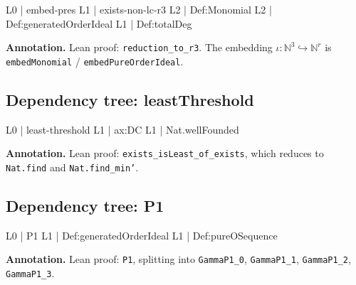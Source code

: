 \documentclass[11pt,reqno]{amsart}
\providecommand{\N}{\mathbb{N}}
\begin{document}
\noindent%
\begin{minipage}[t]{0.48\linewidth}
	\vspace{0pt}
	\begin{verbatimbox}
		L0 | embed-pres
		L1 |   exists-non-lc-r3
		L2 |     Def:Monomial
		L2 |     Def:generatedOrderIdeal
		L1 |   Def:totalDeg
	\end{verbatimbox}
\end{minipage}\hfill 
\begin{minipage}[t]{0.48\linewidth}
	\vspace{0pt}
	\textbf{Annotation.} Lean proof: \texttt{reduction\_to\_r3}. The embedding $\iota:\N^{3}\hookrightarrow\N^{r}$ is \texttt{embedMonomial} / \texttt{embedPureOrderIdeal}.
\end{minipage}

\medskip

\subsection*{Dependency tree: \textsf{leastThreshold}}

\noindent%
\begin{minipage}[t]{0.48\linewidth}
	\vspace{0pt}
	\begin{verbatimbox}
		L0 | least-threshold
		L1 |   ax:DC
		L1 |   Nat.wellFounded
	\end{verbatimbox}
\end{minipage}\hfill 
\begin{minipage}[t]{0.48\linewidth}
	\vspace{0pt}
	\textbf{Annotation.} Lean proof: \texttt{exists\_isLeast\_of\_exists}, which reduces to \texttt{Nat.find} and \texttt{Nat.find\_min'}.
\end{minipage}

\medskip

\subsection*{Dependency tree: \textsf{P1}}

\noindent%
\begin{minipage}[t]{0.48\linewidth}
	\vspace{0pt}
	\begin{verbatimbox}
		L0 | P1
		L1 |   Def:generatedOrderIdeal
		L1 |   Def:pureOSequence
	\end{verbatimbox}
\end{minipage}\hfill 
\begin{minipage}[t]{0.48\linewidth}
	\vspace{0pt}
	\textbf{Annotation.} Lean proof: \texttt{P1}, splitting into \texttt{GammaP1\_0}, \texttt{GammaP1\_1}, \texttt{GammaP1\_2}, \texttt{GammaP1\_3}.
\end{minipage}
\end{document}
